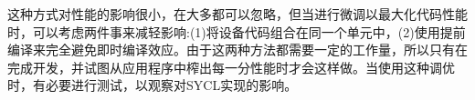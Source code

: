 这种方式对性能的影响很小，在大多都可以忽略，但当进行微调以最大化代码性能时，可以考虑两件事来减轻影响:(1)将设备代码组合在同一个单元中，(2)使用提前编译来完全避免即时编译效应。由于这两种方法都需要一定的工作量，所以只有在完成开发，并试图从应用程序中榨出每一分性能时才会这样做。当使用这种调优时，有必要进行测试，以观察对SYCL实现的影响。\par











































